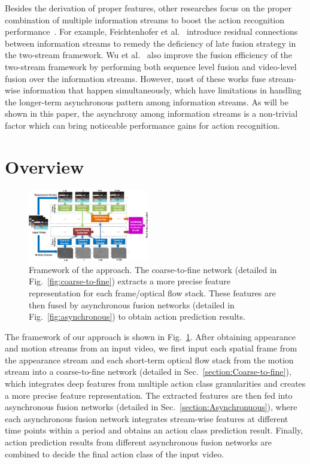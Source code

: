 \documentclass[letterpaper]{article}
\begin{document}
Besides the derivation of proper features, other researches focus on the proper combination of multiple information streams to boost the action recognition performance~\cite{nips,wumultifusion,twostreamfuse,lstmiccv2017}. For example, Feichtenhofer et al.~\cite{nips} introduce residual connections between information streams to remedy the deficiency of late fusion strategy in the two-stream framework. Wu et al.~\cite{wumultifusion} also improve the fusion efficiency of the two-stream framework by performing both sequence level fusion and video-level fusion over the information streams. However, most of these works fuse stream-wise information that happen simultaneously, which have limitations in handling the longer-term asynchronous pattern among information streams. As will be shown in this paper, the asynchrony among information streams is a non-trivial factor which can bring noticeable performance gains for action recognition.


\section{Overview}
\label{section:overview}

\begin{figure}
  \centering
  \includegraphics[width=0.47\textwidth,height=0.30\textwidth]{./figures1/framework.png}
  \caption{Framework of the approach. The coarse-to-fine network (detailed in Fig.~\ref{fig:coarse-to-fine}) extracts a more precise feature representation for each frame/optical flow stack. These features are then fused by asynchronous fusion networks (detailed in Fig.~\ref{fig:asynchronous}) to obtain action prediction results.}
    \label{fig:framework}
\end{figure}

The framework of our approach is shown in Fig.~\ref{fig:framework}. After obtaining appearance and motion streams from an input video, we first input each spatial frame from the appearance stream and each short-term optical flow stack from the motion stream into a coarse-to-fine network (detailed in Sec.~\ref{section:Coarse-to-fine}), which integrates deep features from multiple action class granularities and creates a more precise feature representation. The extracted features are then fed into asynchronous fusion networks (detailed in Sec.~\ref{section:Asynchronuous}), where each asynchronous fusion network integrates stream-wise features at different time points within a period and obtains an action class prediction result. Finally, action prediction results from different asynchronous fusion networks are combined to decide the final action class of the input video.
\end{document}
